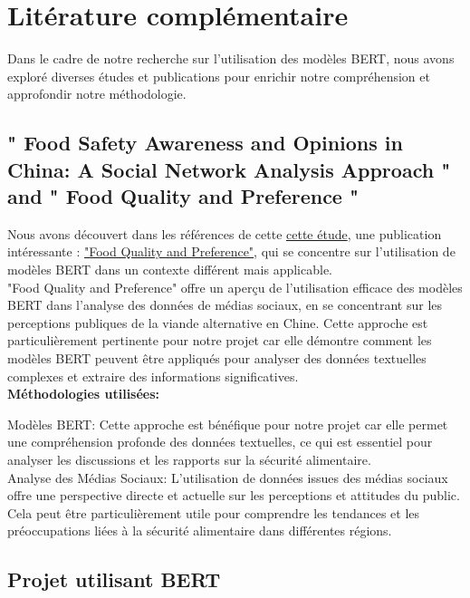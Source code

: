 \documentclass{article}
\begin{document}
\section{Litérature complémentaire}
Dans le cadre de notre recherche sur l'utilisation des modèles BERT, nous avons exploré diverses études et publications pour enrichir notre compréhension et approfondir notre méthodologie.

\subsection{" Food Safety Awareness and Opinions in China: A Social Network Analysis Approach " and " Food Quality and Preference "}
Nous avons découvert dans les références de cette 
\href{https://www.mdpi.com/2304-8158/11/18/2909}{cette étude}, une publication intéressante : 
\href{https://www.sciencedirect.com/science/article/abs/pii/S0950329322000052}{"Food Quality and Preference"}, qui se concentre sur l'utilisation de modèles BERT dans un contexte différent mais applicable. \\

"Food Quality and Preference" offre un aperçu de l'utilisation efficace des modèles BERT dans l'analyse des données de médias sociaux, en se concentrant sur les perceptions publiques de la viande alternative en Chine. Cette approche est particulièrement pertinente pour notre projet car elle démontre comment les modèles BERT peuvent être appliqués pour analyser des données textuelles complexes et extraire des informations significatives. \\

\textbf{Méthodologies utilisées:}

Modèles BERT: Cette approche est bénéfique pour notre projet car elle permet une compréhension profonde des données textuelles, ce qui est essentiel pour analyser les discussions et les rapports sur la sécurité alimentaire. \\

Analyse des Médias Sociaux: L'utilisation de données issues des médias sociaux offre une perspective directe et actuelle sur les perceptions et attitudes du public. Cela peut être particulièrement utile pour comprendre les tendances et les préoccupations liées à la sécurité alimentaire dans différentes régions. \\

\subsection{Projet utilisant BERT}
\end{document}
